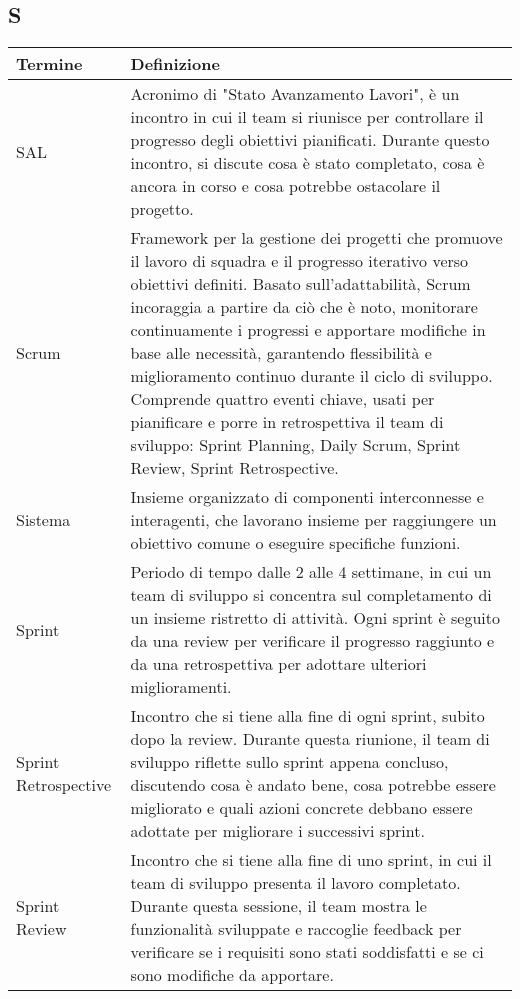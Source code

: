 \documentclass[10pt]{article}
\begin{document}
\subsection{S} %
\begin{longtable}{|>{\centering\arraybackslash}m{2.5cm}|>{\arraybackslash}m{12.5cm}|}
\hline
\rowcolor[gray]{0.8}
\textbf{Termine} & \textbf{Definizione}\\
\endhead
\hline
SAL & Acronimo di "Stato Avanzamento Lavori", è un incontro in cui il team si riunisce per controllare il progresso degli obiettivi pianificati. Durante questo incontro, si discute cosa è stato completato, cosa è ancora in corso e cosa potrebbe ostacolare il progetto.\\
\hline
Scrum & Framework per la gestione dei progetti che promuove il lavoro di squadra e il progresso iterativo verso obiettivi definiti. Basato sull'adattabilità, Scrum incoraggia a partire da ciò che è noto, monitorare continuamente i progressi e apportare modifiche in base alle necessità, garantendo flessibilità e miglioramento continuo durante il ciclo di sviluppo. Comprende quattro eventi chiave, usati per pianificare e porre in retrospettiva il team di sviluppo: Sprint Planning, Daily Scrum, Sprint Review, Sprint Retrospective.\\
\hline
Sistema & Insieme organizzato di componenti interconnesse e interagenti, che lavorano insieme per raggiungere un obiettivo comune o eseguire specifiche funzioni.\\
\hline
Sprint & Periodo di tempo dalle 2 alle 4 settimane, in cui un team di sviluppo si concentra sul completamento di un insieme ristretto di attività. Ogni sprint è seguito da una review per verificare il progresso raggiunto e da una retrospettiva per adottare ulteriori miglioramenti.\\
\hline
Sprint Retrospective & Incontro che si tiene alla fine di ogni sprint, subito dopo la review. Durante questa riunione, il team di sviluppo riflette sullo sprint appena concluso, discutendo cosa è andato bene, cosa potrebbe essere migliorato e quali azioni concrete debbano essere adottate per migliorare i successivi sprint.\\
\hline
Sprint Review & Incontro che si tiene alla fine di uno sprint, in cui il team di sviluppo presenta il lavoro completato. Durante questa sessione, il team mostra le funzionalità sviluppate e raccoglie feedback per verificare se i requisiti sono stati soddisfatti e se ci sono modifiche da apportare.\\
\hline

\end{longtable}
\end{document}
